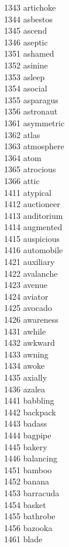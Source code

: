 1343 artichoke \\
1344 asbestos \\
1345 ascend \\
1346 aseptic \\
1351 ashamed \\
1352 asinine \\
1353 asleep \\
1354 asocial \\
1355 asparagus \\
1356 astronaut \\
1361 asymmetric \\
1362 atlas \\
1363 atmosphere \\
1364 atom \\
1365 atrocious \\
1366 attic \\
1411 atypical \\
1412 auctioneer \\
1413 auditorium \\
1414 augmented \\
1415 auspicious \\
1416 automobile \\
1421 auxiliary \\
1422 avalanche \\
1423 avenue \\
1424 aviator \\
1425 avocado \\
1426 awareness \\
1431 awhile \\
1432 awkward \\
1433 awning \\
1434 awoke \\
1435 axially \\
1436 azalea \\
1441 babbling \\
1442 backpack \\
1443 badass \\
1444 bagpipe \\
1445 bakery \\
1446 balancing \\
1451 bamboo \\
1452 banana \\
1453 barracuda \\
1454 basket \\
1455 bathrobe \\
1456 bazooka \\
1461 blade \\
